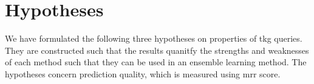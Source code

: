 \section{Hypotheses}
\label{sec:hypotheses}

We have formulated the following three hypotheses on properties of \gls{tkg} queries.
They are constructed such that the results quanitfy the strengths and weaknesses of each method such that they can be used in an ensemble learning method.
The hypotheses concern prediction quality, which is measured using \gls{mrr} score.



